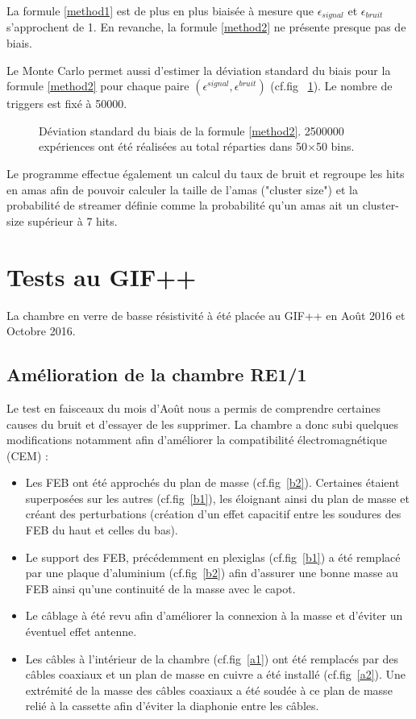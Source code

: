 La formule \ref{method1} est de plus en plus biaisée à mesure que $\epsilon_{signal}$ et $\epsilon_{bruit}$ s'approchent de \num {1}. En revanche, la formule \ref{method2} ne présente presque pas de biais.

Le Monte Carlo permet aussi d'estimer la déviation standard du biais pour la formule \ref{method2} pour chaque paire $\left(\epsilon^{signal},\epsilon^{bruit}\right)$ (cf.fig~ \ref{RMSmethod2}). Le nombre de triggers est fixé à \num{50000}.

\begin{figure}
	\centering
	\caption{Déviation standard du biais de la formule \ref{method2}. \num{2500000} expériences ont été réalisées au total réparties dans \num{50}$\times$\num{50} bins.}
	\label{RMSmethod2}
\end{figure}
\tikzexternalenable

Le programme effectue également un calcul du taux de bruit et regroupe les hits en amas afin de pouvoir calculer la taille de l'amas ("cluster size") et la probabilité de streamer définie comme la probabilité qu'un amas ait un cluster-size supérieur à 7 hits.

\section{Tests au GIF++}
La chambre en verre de basse résistivité à été placée au GIF++ en Août 2016 et Octobre 2016.

\subsection{Amélioration de la chambre RE1/1}
Le test en faisceaux du mois d'Août nous a permis de comprendre certaines causes du bruit et d'essayer de les supprimer.
La chambre a donc subi quelques modifications notamment afin d'améliorer la compatibilité électromagnétique (CEM) \cite{charoy2012comp}:

\begin{itemize}[label=$\bullet$]
	\item Les FEB ont été approchés du plan de masse (cf.fig~\ref{b2}). Certaines étaient superposées sur les autres (cf.fig~\ref{b1}), les éloignant ainsi du plan de masse et créant des perturbations (création d'un effet capacitif entre les soudures des FEB du haut et celles du bas).
	\item Le support des FEB, précédemment en plexiglas (cf.fig~\ref{b1}) a été remplacé par une plaque d'aluminium (cf.fig~\ref{b2}) afin d'assurer une bonne masse au FEB ainsi qu'une continuité de la masse avec le capot.
	\item Le câblage à été revu afin d'améliorer la connexion à la masse et d'éviter un éventuel effet antenne.
	\item Les câbles à l'intérieur de la chambre (cf.fig~\ref{a1}) ont été remplacés par des câbles coaxiaux et un plan de masse en cuivre a été installé (cf.fig~\ref{a2}). Une extrémité de la masse des câbles coaxiaux a été soudée à ce plan de masse relié à la cassette afin d'éviter la diaphonie entre les câbles.
\end{itemize}


